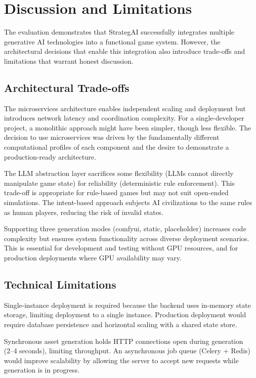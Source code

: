 \documentclass[conference]{IEEEtran}
\begin{document}
\section{Discussion and Limitations}
\label{sec:discussion}

The evaluation demonstrates that StrategAI successfully integrates multiple generative AI technologies into a functional game system. However, the architectural decisions that enable this integration also introduce trade-offs and limitations that warrant honest discussion.

\subsection{Architectural Trade-offs}

The microservices architecture enables independent scaling and deployment but introduces network latency and coordination complexity. For a single-developer project, a monolithic approach might have been simpler, though less flexible. The decision to use microservices was driven by the fundamentally different computational profiles of each component and the desire to demonstrate a production-ready architecture.

The LLM abstraction layer sacrifices some flexibility (LLMs cannot directly manipulate game state) for reliability (deterministic rule enforcement). This trade-off is appropriate for rule-based games but may not suit open-ended simulations. The intent-based approach subjects AI civilizations to the same rules as human players, reducing the risk of invalid states.

Supporting three generation modes (comfyui, static, placeholder) increases code complexity but ensures system functionality across diverse deployment scenarios. This is essential for development and testing without GPU resources, and for production deployments where GPU availability may vary.

\subsection{Technical Limitations}

Single-instance deployment is required because the backend uses in-memory state storage, limiting deployment to a single instance. Production deployment would require database persistence and horizontal scaling with a shared state store.

Synchronous asset generation holds HTTP connections open during generation (2--4 seconds), limiting throughput. An asynchronous job queue (Celery + Redis) would improve scalability by allowing the server to accept new requests while generation is in progress.
\end{document}
